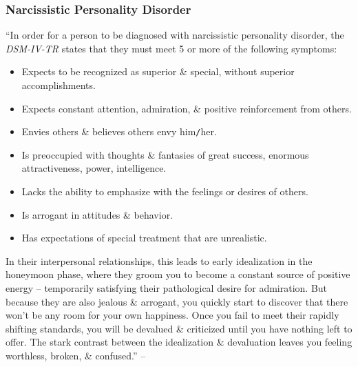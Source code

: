\documentclass{article}
\numberwithin{equation}{section}
\begin{document}
\subsubsection{Narcissistic Personality Disorder}
``In order for a person to be diagnosed with narcissistic personality disorder, the \textit{DSM-IV-TR} states that they must meet 5 or more of the following symptoms:
\begin{itemize}
	\item Expects to be recognized as superior \& special, without superior accomplishments.
	\item Expects constant attention, admiration, \& positive reinforcement from others.
	\item Envies others \& believes others envy him{\tt/}her.
	\item Is preoccupied with thoughts \& fantasies of great success, enormous attractiveness, power, intelligence.
	\item Lacks the ability to emphasize with the feelings or desires of others.
	\item Is arrogant in attitudes \& behavior.
	\item Has expectations of special treatment that are unrealistic.
\end{itemize}
In their interpersonal relationships, this leads to early idealization in the honeymoon phase, where they groom you to become a constant source of positive energy -- temporarily satisfying their pathological desire for admiration. But because they are also jealous \& arrogant, you quickly start to discover that there won't be any room for your own happiness. Once you fail to meet their rapidly shifting standards, you will be devalued \& criticized until you have nothing left to offer. The stark contrast between the idealization \& devaluation leaves you feeling worthless, broken, \& confused.'' -- \cite[pp. 193--194]{MacKenzie2015}
\end{document}
